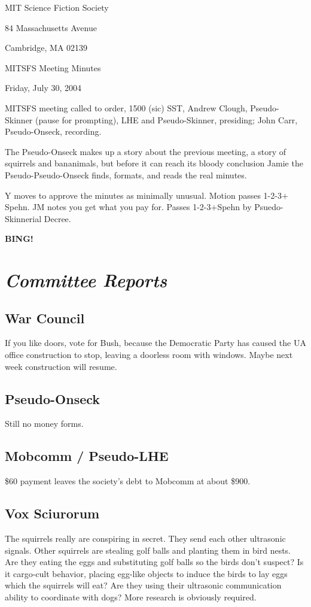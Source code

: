 \documentclass[10pt]{article}
\newcommand{\bing}{{\bf BING!} }
\newcommand{\goto}[1]{\bing \vskip 12pt \section*{{\em{#1}}}}
\begin{document}
\begin{center}

MIT Science Fiction Society 

84 Massachusetts Avenue

Cambridge, MA 02139

\vspace{12pt}

MITSFS Meeting Minutes 

Friday, July 30, 2004

\end{center}
 
\vspace{18pt}

\setlength{\parskip}{6pt}

\noindent
MITSFS meeting called to order, 1500 (sic) SST, Andrew Clough,
Pseudo-Skinner (pause for prompting), LHE and Pseudo-Skinner,
presiding; John Carr, Pseudo-Onseck, recording.

The Pseudo-Onseck makes up a story about the previous meeting, a story
of squirrels and bananimals, but before it can reach its bloody conclusion
Jamie the Pseudo-Pseudo-Onseck finds, formats, and reads the real minutes.

Y moves to approve the minutes as minimally unusual.  Motion passes \hbox{1-2-3$+$Spehn}.
JM notes you get what you pay for.  Passes \hbox{1-2-3$+$Spehn} by Psuedo-Skinnerial Decree.

\goto{Committee Reports}
\subsection*{War Council}  If you like doors, vote for Bush, because the
Democratic Party has caused the UA office construction to stop, leaving
a doorless room with windows.  Maybe next week construction will resume.

\subsection*{Pseudo-Onseck}  Still no money forms.

\subsection*{Mobcomm / Pseudo-LHE} \$60 payment leaves the society's
debt to Mobcomm at about \$900.

\subsection*{Vox Sciurorum}  The squirrels really are conspiring in
secret.  They send each other ultrasonic signals.  Other squirrels
are stealing golf balls and planting them in bird nests.  Are they
eating the eggs and substituting golf balls so the birds don't suspect?
Is it cargo-cult behavior, placing egg-like objects to induce the
birds to lay eggs which the squirrels will eat?  Are they using their
ultrasonic communication ability to coordinate with dogs?  More research
is obviously required.
\end{document}
